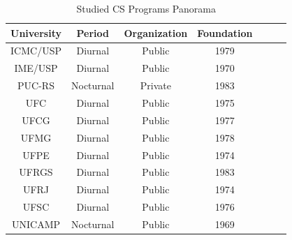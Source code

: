 \documentclass{beamer}
\begin{document}
\begin{frame}
\begin{table}
	\scriptsize
	\caption{Studied CS Programs Panorama}
    \begin{tabular}{|c|c|c|c|c|c|c|}
        \hline
        University  & Period    & Organization & Foundation   \\ \hline
        \rowcolor{n_green!40}
        ICMC/USP    & Diurnal   & Public       & 1979         \\ 
        \rowcolor{n_green!40}
        IME/USP     & Diurnal   & Public       & 1970         \\ 
        PUC-RS      & Nocturnal & Private      & 1983         \\ 
        UFC         & Diurnal   & Public       & 1975         \\ 
        UFCG        & Diurnal   & Public       & 1977         \\ 
        UFMG        & Diurnal   & Public       & 1978         \\ 
        UFPE        & Diurnal   & Public       & 1974         \\ 
        UFRGS       & Diurnal   & Public       & 1983         \\ 
        \rowcolor{n_green!40}
        UFRJ        & Diurnal   & Public       & 1974         \\ 
        UFSC        & Diurnal   & Public       & 1976         \\ 
        UNICAMP     & Nocturnal & Public       & 1969         \\
        \hline
    \end{tabular}
\end{table}
\end{frame}
\end{document}

